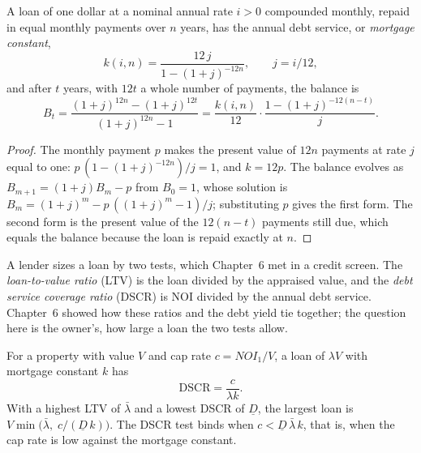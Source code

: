 \begin{chapterrefs}
\begin{proposition}\label{prop10:loan}
A loan of one dollar at a nominal annual rate $i>0$ compounded monthly, repaid in equal monthly payments
over $n$ years, has the
annual debt service, or \emph{mortgage constant},
\begin{equation}\label{eq10:constant}
  k(i,n) = \frac{12\,j}{1-(1+j)^{-12n}}, \qquad j=i/12,
\end{equation}
and after $t$ years, with $12t$ a whole number of payments, the balance is
\begin{equation}\label{eq10:balance}
  B_t = \frac{(1+j)^{12n}-(1+j)^{12t}}{(1+j)^{12n}-1}
  = \frac{k(i,n)}{12}\cdot\frac{1-(1+j)^{-12(n-t)}}{j}.
\end{equation}
\end{proposition}

\begin{proof}
The monthly payment $p$ makes the present value of $12n$ payments at rate $j$ equal to one:
$p\,(1-(1+j)^{-12n})/j=1$, and $k=12p$. The balance evolves as $B_{m+1}=(1+j)B_m-p$ from $B_0=1$, whose
solution is $B_m=(1+j)^m-p\,((1+j)^m-1)/j$; substituting $p$ gives the first form. The second form is
the present value of the $12(n-t)$ payments still due, which equals the balance because the loan is
repaid exactly at $n$.
\end{proof}

A lender sizes a loan by two tests, which Chapter~6 met in a credit screen. The
\emph{loan-to-value ratio} (LTV) is the loan divided by the appraised value, and the \emph{debt service
coverage ratio} (DSCR) is NOI divided by the annual debt service. Chapter~6 showed how these ratios and
the debt yield tie together; the question here is the owner's, how large a loan the two tests allow.

\begin{proposition}\label{prop10:dscr}
For a property with value $V$ and cap rate $c=\mathit{NOI}_1/V$, a loan of $\lambda V$ with mortgage
constant $k$ has
\begin{equation}\label{eq10:dscr}
  \mathrm{DSCR} = \frac{c}{\lambda k}.
\end{equation}
With a highest LTV of $\bar\lambda$ and a lowest DSCR of $\underline D$, the largest loan is
$V\min\bigl(\bar\lambda,\;c/(\underline D\,k)\bigr)$. The DSCR test binds when $c<\underline D\,\bar\lambda\,k$,
that is, when the cap rate is low against the mortgage constant.
\end{proposition}


\end{chapterrefs}
